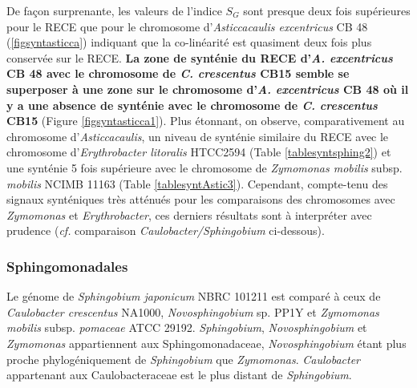    De façon surprenante, les valeurs de l'indice $S_{G}$ sont presque deux fois supérieures pour le RECE que pour le chromosome d'\textit{Asticcacaulis excentricus} CB 48 (\ref{figsyntasticca}) indiquant que la co-linéarité est quasiment deux fois plus conservée sur le RECE. \textbf{\color{orange}La zone de synténie du RECE d'\textit{A. excentricus} CB 48 avec le chromosome de \textit{C. crescentus} CB15 semble se superposer à une zone sur le chromosome d'\textit{A. excentricus} CB 48 où il y a une absence de synténie avec le chromosome de \textit{C. crescentus} CB15} (Figure \ref{figsyntasticca1}). Plus étonnant, on observe, comparativement au chromosome d'\textit{Asticcacaulis}, un niveau de synténie similaire du RECE avec le chromosome d'\textit{Erythrobacter litoralis} HTCC2594 (Table \ref{tablesyntsphing2}) et une synténie 5 fois supérieure avec le chromosome de \textit{Zymomonas mobilis} subsp. \textit{mobilis} NCIMB 11163 (Table \ref{tablesyntAstic3}). Cependant, compte-tenu des signaux synténiques très atténués pour les comparaisons des chromosomes avec \textit{Zymomonas} et \textit{Erythrobacter}, ces derniers résultats sont à interpréter avec prudence (\textit{cf.} comparaison \textit{Caulobacter/Sphingobium} ci-dessous). 
 
 
\subsubsection{Sphingomonadales}\label{parsphi}
	 Le génome de \textit{Sphingobium japonicum} NBRC 101211 est comparé à ceux de \textit{Caulobacter crescentus} NA1000, \textit{Novosphingobium} sp. PP1Y et \textit{Zymomonas mobilis} subsp. \textit{pomaceae} ATCC 29192. \textit{Sphingobium}, \textit{Novosphingobium} et \textit{Zymomonas} appartiennent aux Sphingomonadaceae, \textit{Novosphingobium} étant plus proche phylogéniquement de \textit{Sphingobium} que \textit{Zymomonas}. \textit{Caulobacter} appartenant aux Caulobacteraceae est le plus distant de \textit{Sphingobium}.

